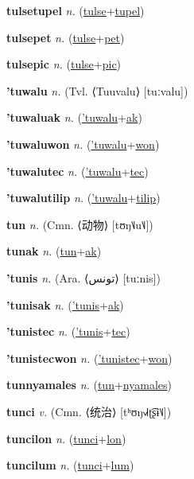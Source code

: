 \textbf{\hypertarget{tulsetupel}{tulsetupel}} \textit{n.} (\hyperlink{tulse}{tulse}+\allowbreak \hyperlink{tupel}{tupel})


\textbf{\hypertarget{tulsepet}{tulsepet}} \textit{n.} (\hyperlink{tulse}{tulse}+\allowbreak \hyperlink{pet}{pet})


\textbf{\hypertarget{tulsepic}{tulsepic}} \textit{n.} (\hyperlink{tulse}{tulse}+\allowbreak \hyperlink{pic}{pic})


\textbf{\hypertarget{'tuwalu}{'tuwalu}} \textit{n.} (Tvl. ⟨Tuuvalu⟩ [tuːvalu])


\textbf{\hypertarget{'tuwaluak}{'tuwaluak}} \textit{n.} (\hyperlink{'tuwalu}{'tuwalu}+\allowbreak \hyperlink{ak}{ak})


\textbf{\hypertarget{'tuwaluwon}{'tuwaluwon}} \textit{n.} (\hyperlink{'tuwalu}{'tuwalu}+\allowbreak \hyperlink{won}{won})


\textbf{\hypertarget{'tuwalutec}{'tuwalutec}} \textit{n.} (\hyperlink{'tuwalu}{'tuwalu}+\allowbreak \hyperlink{tec}{tec})


\textbf{\hypertarget{'tuwalutilip}{'tuwalutilip}} \textit{n.} (\hyperlink{'tuwalu}{'tuwalu}+\allowbreak \hyperlink{tilip}{tilip})


\textbf{\hypertarget{tun}{tun}} \textit{n.} (Cmn. ⟨{\chinese{}动物}⟩ [tʊŋ˥˩u˥˩])


\textbf{\hypertarget{tunak}{tunak}} \textit{n.} (\hyperlink{tun}{tun}+\allowbreak \hyperlink{ak}{ak})


\textbf{\hypertarget{'tunis}{'tunis}} \textit{n.} (Ara. ⟨{\arabics{}تونس}⟩ [tuːnis])


\textbf{\hypertarget{'tunisak}{'tunisak}} \textit{n.} (\hyperlink{'tunis}{'tunis}+\allowbreak \hyperlink{ak}{ak})


\textbf{\hypertarget{'tunistec}{'tunistec}} \textit{n.} (\hyperlink{'tunis}{'tunis}+\allowbreak \hyperlink{tec}{tec})


\textbf{\hypertarget{'tunistecwon}{'tunistecwon}} \textit{n.} (\hyperlink{'tunistec}{'tunistec}+\allowbreak \hyperlink{won}{won})


\textbf{\hypertarget{tunnyamales}{tunnyamales}} \textit{n.} (\hyperlink{tun}{tun}+\allowbreak \hyperlink{nyamales}{nyamales})


\textbf{\hypertarget{tunci}{tunci}} \textit{v.} (Cmn. ⟨{\chinese{}统治}⟩ [tʰʊŋ˧˩˧ʈ͡ʂɨ˥˩])


\textbf{\hypertarget{tuncilon}{tuncilon}} \textit{n.} (\hyperlink{tunci}{tunci}+\allowbreak \hyperlink{lon}{lon})


\textbf{\hypertarget{tuncilum}{tuncilum}} \textit{n.} (\hyperlink{tunci}{tunci}+\allowbreak \hyperlink{lum}{lum})


